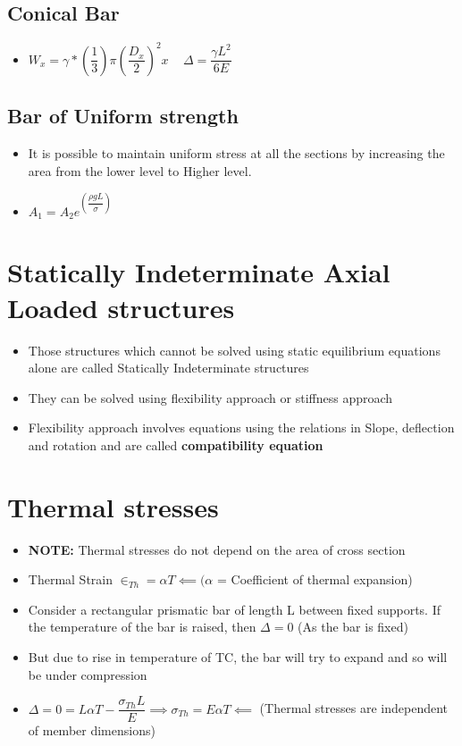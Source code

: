 \documentclass[8pt]{report}
\begin{document}
		\subsection{Conical Bar}
			\begin{itemize}
				\item $\boxed{W_x = \gamma*\left(\dfrac{1}{3}\right)\pi\left(\dfrac{D_x}{2}\right)^2x}$ $\;\;\;\boxed{\Delta = \dfrac{\gamma L^2}{6E}}$
			\end{itemize}
		\subsection{Bar of Uniform strength}
			\begin{itemize}
				\item It is possible to maintain uniform stress at all the sections by increasing the area from the lower level to Higher level.
				\item $\boxed{A_1=A_2e^{\left(\dfrac{\rho gL}{\sigma}\right)}}$
			\end{itemize}\hrulefill
	\section{Statically Indeterminate Axial Loaded structures}
		\begin{itemize}
			\item Those structures which cannot be solved using static equilibrium equations alone are called Statically Indeterminate structures
			\item They can be solved using flexibility approach or stiffness approach
			\item Flexibility approach involves equations using the relations in Slope, deflection and rotation and are called \textbf{compatibility equation}
		\end{itemize}\hrulefill
	\section{Thermal stresses}
		\begin{itemize}
			\item \textbf{NOTE: }Thermal stresses do not depend on the area of cross section
			\item Thermal Strain $\boxed{\in_{Th} = \alpha T} \impliedby (\alpha$ = Coefficient of thermal expansion)
			\item Consider a rectangular prismatic bar of length L between fixed supports. If the temperature of the bar is raised, then $\Delta = 0$ (As the bar is fixed)
			\item But due to rise in temperature of T\textdegree C, the bar will try to expand and so will be under compression
			\item $\Delta = 0 = L\alpha T - \dfrac{\sigma_{Th} L}{E} \implies \boxed{\sigma_{Th} = E\alpha T} \impliedby$ (Thermal stresses are independent of member dimensions)
		\end{itemize}\hrulefill
\end{document}

